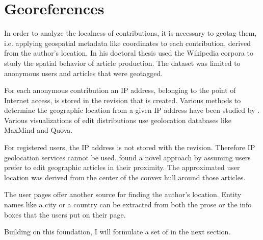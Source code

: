 \section{Georeferences}\label{sec:georeference}

In order to analyze the localness of contributions, it is necessary to geotag them, i.e. applying geospatial metadata like coordinates to each contribution, derived from the author's location.
In his doctoral thesis \textcite{hardy2011volunteered} used the Wikipedia corpora to study the spatial behavior of article production.
The dataset was limited to anonymous users and articles that were geotagged.

For each anonymous contribution an \ac{IP} address, belonging to the point of Internet access, is stored in the revision that is created.
Various methods to determine the geographic location from a given \ac{IP} address have been studied by \textcite{muir2009internet}.
Various visualizations  of edit distributions use geolocation databases like MaxMind and Quova.

For registered users, the \ac{IP} address is not stored with the revision.
Therefore \ac{IP} geolocation services cannot be used.
\textcite{lieberman2009you} found a novel approach by assuming users prefer to edit geographic articles in their proximity.
The approximated user location was derived from the center of the convex hull around those articles.

The user pages offer another source for finding the author's location.
Entity names like a city or a country can be extracted from both the prose or the info boxes that the users put on their page.

Building on this foundation, I will formulate a set of  in the next section.